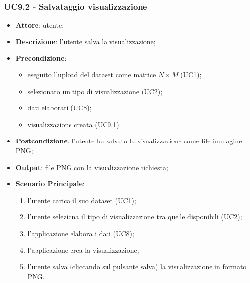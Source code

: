     \subsubsection{UC9.2 - Salvataggio visualizzazione}
    \label{uc9.2}
    \begin{itemize}
    \item \textbf{Attore}: utente;
    \item \textbf{Descrizione}: l'utente salva la visualizzazione;
    \item \textbf{Precondizione}: 
    \begin{itemize}
        \item eseguito l'upload del dataset come matrice $N\times M$ (\hyperref[uc1]{UC1});
        \item selezionato un tipo di visualizzazione (\hyperref[uc2]{UC2});
        \item dati elaborati (\hyperref[uc8]{UC8});
        \item visualizzazione creata (\hyperref[uc9.1]{UC9.1}).
    \end{itemize}  
    \item \textbf{Postcondizione}: l'utente ha salvato la visualizzazione come file immagine PNG;
    \item \textbf{Output}: file PNG con la visualizzazione richiesta;
    \item \textbf{Scenario Principale}: 
    \begin{enumerate}
        \item l'utente carica il suo dataset (\hyperref[uc1]{UC1});
        \item l'utente seleziona il tipo di visualizzazione tra quelle disponibili (\hyperref[uc2]{UC2});
        \item l'applicazione elabora i dati (\hyperref[uc8]{UC8});
        \item l'applicazione crea la visualizzazione;
        \item l'utente salva (cliccando sul pulsante salva) la visualizzazione in formato PNG.
    \end{enumerate}
    \end{itemize}